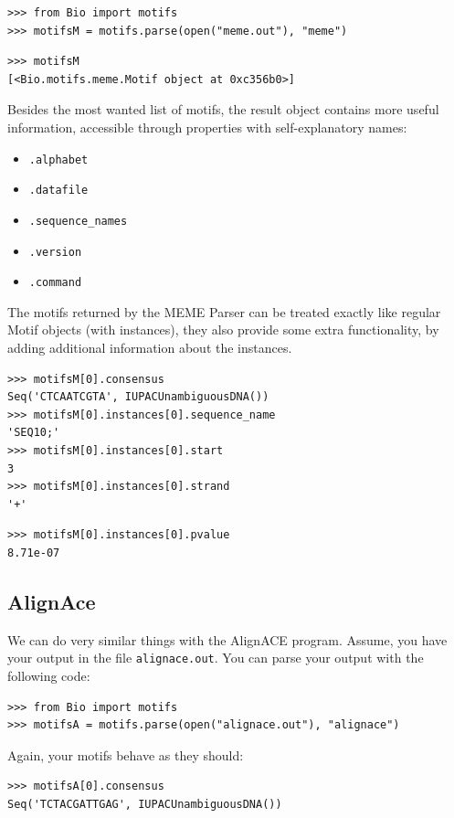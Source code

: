 \documentclass{report}
\begin{document}
\begin{verbatim}
>>> from Bio import motifs
>>> motifsM = motifs.parse(open("meme.out"), "meme")
\end{verbatim}
\begin{verbatim}
>>> motifsM
[<Bio.motifs.meme.Motif object at 0xc356b0>]
\end{verbatim}

Besides the most wanted list of motifs, the result object contains more useful information, accessible through properties with self-explanatory names:
\begin{itemize}
\item \verb|.alphabet|
\item \verb|.datafile|
\item \verb|.sequence_names|
\item \verb|.version|
\item \verb|.command|
\end{itemize}

The motifs returned by the MEME Parser can be treated exactly like regular
Motif objects (with instances), they also provide some extra
functionality, by adding additional information about the instances. 

\begin{verbatim}
>>> motifsM[0].consensus
Seq('CTCAATCGTA', IUPACUnambiguousDNA())
>>> motifsM[0].instances[0].sequence_name
'SEQ10;'
>>> motifsM[0].instances[0].start
3
>>> motifsM[0].instances[0].strand
'+'
\end{verbatim}
\begin{verbatim}
>>> motifsM[0].instances[0].pvalue
8.71e-07
\end{verbatim}


\subsection{AlignAce}
\label{sec:alignace}

We can do very similar things with the AlignACE program. Assume, you have
your output in the file \verb|alignace.out|. You can parse your output
with the following code:

\begin{verbatim}
>>> from Bio import motifs
>>> motifsA = motifs.parse(open("alignace.out"), "alignace")
\end{verbatim}

Again, your motifs behave as they should:
\begin{verbatim}
>>> motifsA[0].consensus
Seq('TCTACGATTGAG', IUPACUnambiguousDNA())
\end{verbatim}
\end{document}

